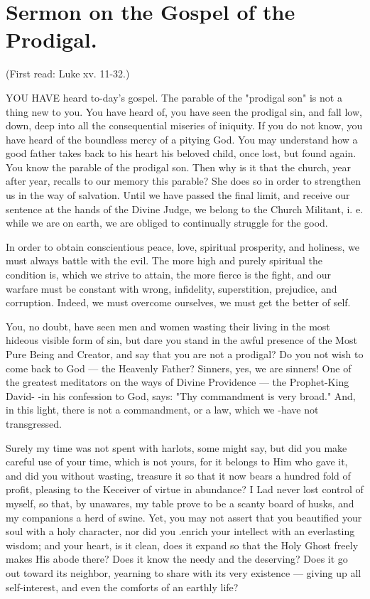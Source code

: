 \chapter{Sermon on the Gospel of the Prodigal.}

(First read: Luke xv. 11-32.)

YOU HAVE heard to-day's gospel. The 
parable of the "prodigal son" is not a thing 
new to you. You have heard of, you have seen 
the prodigal sin, and fall low, down, deep into 
all the consequential miseries of iniquity. If 
you do not know, you have heard of the boundless
mercy of a pitying God. You may understand
how a good father takes back to his heart 
his beloved child, once lost, but found again. 
You know the parable of the prodigal son. 
Then why is it that the church, year after year, 
recalls to our memory this parable? She does 
so in order to strengthen us in the way of salvation.
Until we have passed the final limit, and 
receive our sentence at the hands of the Divine 
Judge, we belong to the Church Militant, i. e. 
while we are on earth, we are obliged to continually
    struggle for the good. 

In order to obtain conscientious peace, love,
spiritual prosperity, and holiness, we must 
always battle with the evil. The more high 
and purely spiritual the condition is, which we 
strive to attain, the more fierce is the fight, and 
our warfare must be constant with wrong, infidelity,
superstition, prejudice, and corruption. 
Indeed, we must overcome ourselves, we must 
get the better of self. 

You, no doubt, have seen men and women 
wasting their living in the most hideous visible 
form of sin, but dare you stand in the awful 
presence of the Most Pure Being and Creator, 
and say that you are not a prodigal? Do you 
not wish to come back to God — the Heavenly 
Father? Sinners, yes, we are sinners! One of 
the greatest meditators on the ways of Divine 
Providence — the Prophet-King David- -in his 
confession to God, says: "Thy commandment 
is very broad." And, in this light, there is not 
a commandment, or a law, which we -have not 
transgressed. 

Surely my time was not spent with harlots, 
some might say, but did you make careful use 
of your time, which is not yours, for it belongs 
to Him who gave it, and did you without wasting, 
treasure it so that it now bears a hundred fold 
of profit, pleasing to the Keceiver of virtue in
abundance? I Lad never lost control of myself, 
so that, by unawares, my table prove to be a 
scanty board of husks, and my companions a 
herd of swine. Yet, you may not assert that 
you beautified your soul with a holy character, 
nor did you .enrich your intellect with an everlasting
wisdom; and your heart, is it clean, does 
it expand so that the Holy Ghost freely makes 
His abode there? Does it know the needy and 
the deserving? Does it go out toward its neighbor,
yearning to share with its very existence — 
giving up all self-interest, and even the comforts
of an earthly life? 

